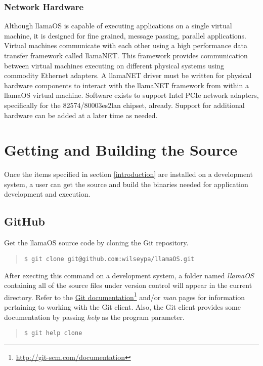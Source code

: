 \documentclass[draft]{article}
\begin{document}
\subsubsection{Network Hardware}

Although llamaOS is capable of executing applications on a single virtual 
machine, it is designed for fine grained, message passing, parallel 
applications.  Virtual machines communicate with each other using a high 
performance data transfer framework called llamaNET.  This framework provides 
communication between virtual machines executing on different physical systems 
using commodity Ethernet adapters.  A llamaNET driver must be written for 
physical hardware components to interact with the llamaNET framework from 
within a llamaOS virtual machine.  Software exists to support Intel PCIe 
network adapters, specifically for the 82574/80003es2lan chipset, already.  
Support for additional hardware can be added at a later time as needed.

\section{Getting and Building the Source}

Once the items specified in section \ref{introduction} are installed on a 
development system, a user can get the source and build the binaries needed 
for application development and execution.

\subsection{GitHub}

Get the llamaOS source code by cloning the Git repository.

\begin{quote}
 \texttt{\$ git clone git@github.com:wilseypa/llamaOS.git}
\end{quote}

After execting this command on a development system, a folder named 
\emph{llamaOS} containing all of the source files under version control will 
appear in the current directory.  Refer to the 
\href{http://git-scm.com/documentation}{Git 
documentation}\footnote{\url{http://git-scm.com/documentation}} and/or 
\emph{man} pages for information pertaining to working with the Git client.  
Also, the Git client provides some documentation by passing \emph{help} as the 
program parameter.

\begin{quote}
 \texttt{\$ git help clone}
\end{quote}
\end{document}
